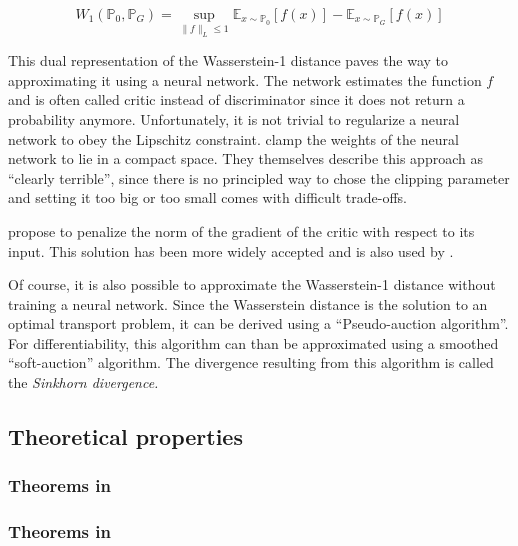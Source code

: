 \begin{theorem}
    \begin{equation}
        W_{1}\left(\mathbb{P}_0, \mathbb{P}_G\right)=\sup _{\|f\|_L \leq 1} \mathbb{E}_{x \sim \mathbb{P}_0}[f(x)]-\mathbb{E}_{x \sim \mathbb{P}_G}[f(x)]
    \end{equation}
\end{theorem}

This dual representation of the Wasserstein-1 distance paves the way to approximating it using a neural network.
The network estimates the function $f$ and is often called critic instead of discriminator since it does not return a probability anymore.
Unfortunately, it is not trivial to regularize a neural network to obey the Lipschitz constraint.
\Textcite{arjovsky2017wassersteingan} clamp the weights of the neural network to lie in a compact space.
They themselves describe this approach as ``clearly terrible'', since there is no principled way to chose the clipping parameter and setting it too big or too small comes with difficult trade-offs. %

\Textcite{gulrajani2017improvedtrainingwassersteingans} propose to penalize the norm of the gradient of the critic with respect to its input.
This solution has been more widely accepted and is also used by \textcite{athey2021using}.

Of course, it is also possible to approximate the Wasserstein-1 distance without training a neural network.
Since the Wasserstein distance is the solution to an optimal transport problem, it can be derived using a ``Pseudo-auction algorithm''.
For differentiability, this algorithm can than be approximated using a smoothed ``soft-auction'' algorithm.
The divergence resulting from this algorithm is called the \textit{Sinkhorn divergence.} %

\subsection{Theoretical properties}
\label{sec:theory}

\subsubsection{Theorems in \cite{goodfellow2014generative}}



\subsubsection{Theorems in \cite{kaji2023adversarial}}
\label{sec:theorems_paper}

